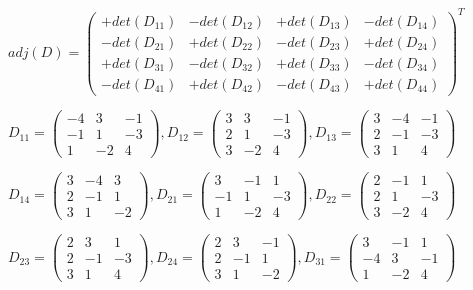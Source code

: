 \documentclass[fleqn]{article}
\begin{document}
\begin{enumerate}
    $
    adj(D)=
      \begin{pmatrix}
        +det(D_{11}) & -det(D_{12}) & +det(D_{13}) & -det(D_{14}) \\ 
        -det(D_{21}) & +det(D_{22}) & -det(D_{23}) & +det(D_{24}) \\ 
        +det(D_{31}) & -det(D_{32}) & +det(D_{33}) & -det(D_{34}) \\ 
        -det(D_{41}) & +det(D_{42}) & -det(D_{43}) & +det(D_{44}) 
      \end{pmatrix}^T
    $

    $D_{11}=
      \begin{pmatrix}
        -4 & 3 & -1 \\ 
        -1 & 1 & -3 \\ 
        1 & -2 &  4
      \end{pmatrix},
      D_{12}=
      \begin{pmatrix}
       3 & 3 & -1 \\
       2 & 1 & -3 \\
       3 & -2 & 4 
      \end{pmatrix},
      D_{13}=\begin{pmatrix}
       3 & -4 & -1 \\
       2 & -1 & -3 \\
       3 & 1 &  4 
      \end{pmatrix}
    $


    $D_{14}=
      \begin{pmatrix}
       3 & -4 & 3 \\
       2 & -1 & 1 \\
       3 & 1 &  -2
      \end{pmatrix},
      D_{21}=
      \begin{pmatrix}
       3 & -1 & 1 \\
       -1 & 1 & -3 \\
       1 & -2 &  4
      \end{pmatrix},
      D_{22}=\begin{pmatrix}
       2 & -1 & 1 \\
       2 & 1 & -3 \\
       3 & -2 & 4 
      \end{pmatrix}
    $

    $D_{23}=
      \begin{pmatrix}
       2 & 3 & 1 \\
       2 & -1 & -3 \\
       3 & 1 & 4 
      \end{pmatrix},
      D_{24}=
      \begin{pmatrix}
       2 & 3 & -1 \\
       2 & -1 & 1 \\
       3 & 1 & -2 
      \end{pmatrix},
      D_{31}=\begin{pmatrix}
       3 & -1 & 1 \\
       -4 & 3 & -1 \\
       1 & -2 & 4 
      \end{pmatrix}
    $


\end{enumerate}
\end{document}
